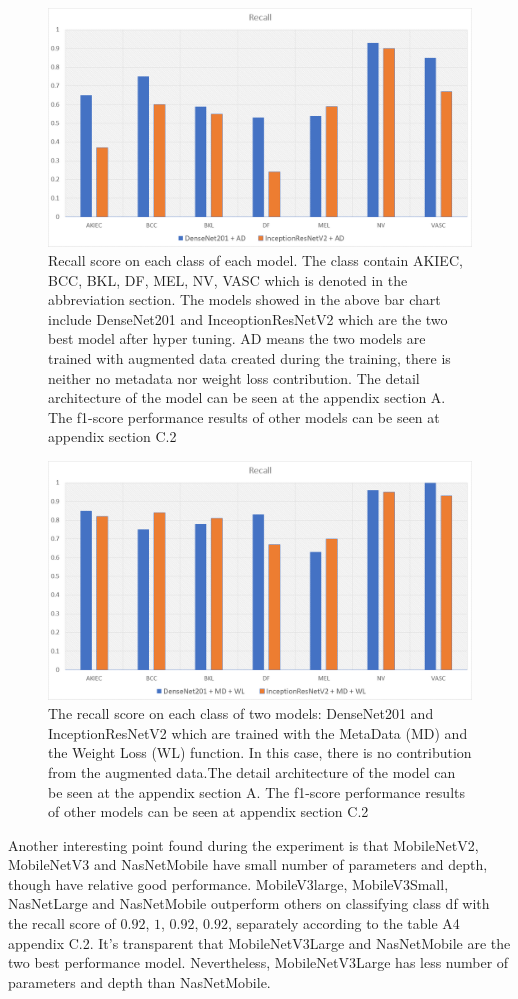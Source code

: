 \documentclass[sensors,article,submit,pdftex,moreauthors]{Definitions/mdpi}
\begin{document}
\begin{figure}[H]
	\centering
	\includegraphics[width=0.7\linewidth]{Definitions/re AD}
	\caption{Recall score on each class of each model. The class contain AKIEC, BCC, BKL, DF, MEL, NV, VASC which is denoted in the abbreviation section. The models showed in the above bar chart include DenseNet201 and InceoptionResNetV2 which are the two best model after hyper tuning. AD means the two models are trained with augmented data created during the training, there is neither no metadata nor weight loss contribution. The detail architecture of the model can be seen at the appendix section A. The f1-score performance results of other models can be seen at appendix section C.2}
	\label{fig:re AD}
\end{figure}
\begin{figure}[H]
	\centering
	\includegraphics[width=0.7\linewidth]{Definitions/re MD WL}
	\caption{The recall score on each class of two models: DenseNet201 and InceptionResNetV2 which are trained with the MetaData (MD) and the Weight Loss (WL) function. In this case, there is no contribution from the augmented data.The detail architecture of the model can be seen at the appendix section A. The f1-score performance results of other models can be seen at appendix section C.2}
	\label{fig:re MD WL}
\end{figure}

Another interesting point found during the experiment is that MobileNetV2, MobileNetV3 and NasNetMobile have small number of parameters and depth, though have relative good performance. MobileV3large, MobileV3Small, NasNetLarge and NasNetMobile outperform others on classifying class df with the recall score of $0.92$, $1$, $0.92$, $0.92$, separately according to the  table A4 appendix C.2.  It's transparent that MobileNetV3Large and NasNetMobile are the two best performance model. Nevertheless, MobileNetV3Large has less number of parameters and depth than NasNetMobile.
\end{document}
